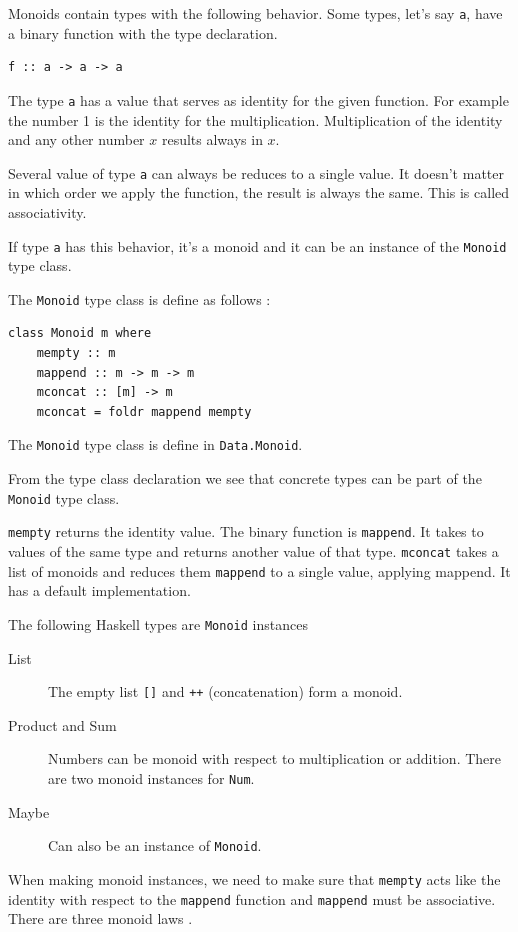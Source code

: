 Monoids contain types with the following behavior. 
Some types, let's say \verb|a|, have a binary function with the type declaration. 
\begin{verbatim}
f :: a -> a -> a
\end{verbatim}

The type \verb|a| has a value that serves as identity for the given function. For example the number 1 is the identity for the multiplication. Multiplication of the identity and any other number $x$ results always in $x$.

Several value of type \verb|a| can always be reduces to a single value. It doesn't matter in which order we apply the function, the result is always the same. This is called associativity.

If type \verb|a| has this behavior, it's a monoid and it can be an instance of the \verb|Monoid| type class.

The \verb|Monoid| type class is define as follows \cite{monoid}:
\begin{verbatim}
class Monoid m where
    mempty :: m
    mappend :: m -> m -> m
    mconcat :: [m] -> m
    mconcat = foldr mappend mempty
\end{verbatim}

The \verb|Monoid| type class is define in \verb|Data.Monoid|. 

From the type class declaration we see that concrete types can be part of the \verb|Monoid| type class. 

\verb|mempty| returns the identity value. The binary function is \verb|mappend|. It takes to values of the same type and returns another value of that type. \verb|mconcat| takes a list of monoids and reduces them \verb|mappend| to a single value, applying mappend. It has a default implementation.

The following Haskell types are \verb|Monoid| instances
\begin{description}
\item[List] The empty list \verb|[]| and \verb|++| (concatenation) form a monoid.
\item[Product and Sum] Numbers can be monoid with respect to multiplication or addition. There are two monoid instances for \verb|Num|.
\item[Maybe] Can also be an instance of \verb|Monoid|.
\end{description}

When making monoid instances, we need to make sure that \verb|mempty| acts like the identity with respect to the \verb|mappend| function and \verb|mappend| must be associative. There are three monoid laws \cite{monoid}.


